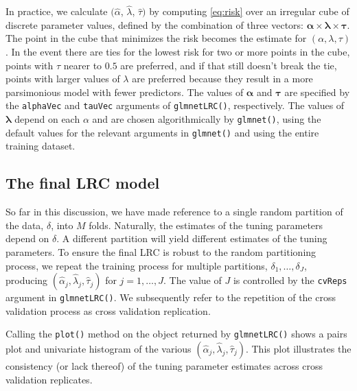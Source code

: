 \documentclass{article}
\begin{document}
In practice, we calculate $(\hat\alpha$, $\hat\lambda$, $\hat\tau)$ by computing \eqref{eq:risk} over an irregular
cube of discrete parameter values, defined by the combination of three vectors:  
$\boldsymbol\alpha \times \boldsymbol\lambda \times \boldsymbol\tau$.
The point in the cube that minimizes the risk becomes the estimate for $(\alpha, \lambda, \tau)$. In the event there
are ties for the lowest risk for two or more points in the cube, points with $\tau$ nearer to $0.5$ are preferred, and
if that still doesn't break the tie, points with larger values of $\lambda$ are preferred because they result in
a more parsimonious model with fewer predictors.
The values of $\boldsymbol\alpha$ and $\boldsymbol\tau$ are specified by the {\tt alphaVec} and {\tt tauVec} arguments
of {\tt glmnetLRC()}, respectively.  The values of $\boldsymbol\lambda$ depend on each $\alpha$ and are chosen algorithmically
by {\tt glmnet()}, using the default values for the relevant arguments in {\tt glmnet()} and using the entire training dataset.

\subsection{The final LRC model}

So far in this discussion, we have made reference to a single random partition of the data, $\delta$, into $M$ folds. 
Naturally, the estimates of the tuning parameters depend on $\delta$. A different partition will yield different
estimates of the tuning parameters.  To ensure the final LRC is robust to the random 
partitioning process, we repeat the training process for multiple partitions, $\delta_1,\ldots,\delta_J$, producing
$(\hat\alpha_j, \hat\lambda_j, \hat\tau_j)$ for $j = 1,\ldots,J$.  
The value of $J$ is controlled by the {\tt cvReps} argument in {\tt glmnetLRC()}. We subsequently
refer to the repetition of the cross validation process as cross validation replication.

Calling the {\tt plot()} method
on the object returned by {\tt glmnetLRC()} shows a pairs plot and univariate histogram of the
various $(\hat\alpha_j, \hat\lambda_j, \hat\tau_j)$.  This plot illustrates the consistency (or lack thereof) 
of the tuning parameter estimates across cross validation replicates.
\end{document}
